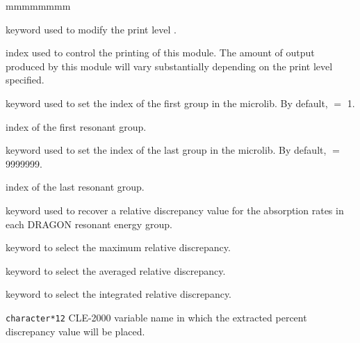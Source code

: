 \begin{ListeDeDescription}{mmmmmmmm}

\item[\moc{EDIT}] keyword used to modify the print level .

\item[\dusa{iprint}] index used to control the printing of this module. The
amount of output produced by this module will vary substantially
depending on the print level specified. 

\item[\moc{GRMI}] keyword used to set the index of the first group in the microlib. By default,  $=$ 1.

\item[\dusa{igrp1}] index of the first resonant group.

\item[\moc{GRMA}] keyword used to set the index of the last group in the microlib. By default,  $=$ 9999999.

\item[\dusa{igrp2}] index of the last resonant group.

\item[\moc{PICK}]  keyword used to recover a relative discrepancy value for the absorption rates in
each DRAGON resonant energy group.

\item[\moc{MAXV}] keyword to select the maximum relative discrepancy.

\item[\moc{AVER}] keyword to select the averaged relative discrepancy.

\item[\moc{INTG}] keyword to select the integrated relative discrepancy.

\item[\dusa{error}] \texttt{character*12} CLE-2000 variable name in which the extracted percent
discrepancy value will be placed.

\end{ListeDeDescription}
\eject
